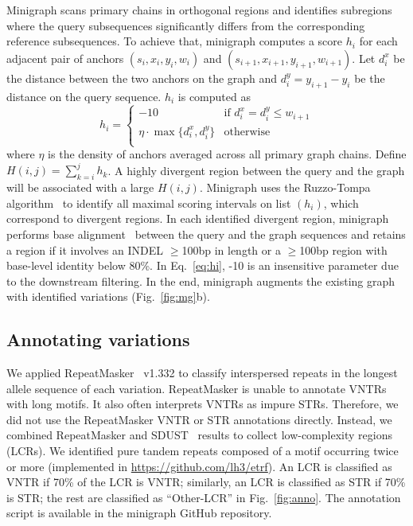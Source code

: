 \documentclass[twocolumn]{bmcart}
\begin{document}
Minigraph scans primary chains in orthogonal regions and identifies subregions
where the query subsequences significantly differs from the corresponding
reference subsequences. To achieve that, minigraph computes a score $h_i$ for
each adjacent pair of anchors $(s_i,x_i,y_i,w_i)$ and
$(s_{i+1},x_{i+1},y_{i+1},w_{i+1})$. Let $d^x_i$ be the distance between the
two anchors on the graph and $d^y_i=y_{i+1}-y_i$ be the distance on the query
sequence. $h_i$ is computed as
\begin{equation}\label{eq:hi}
h_i=\left\{\begin{array}{ll}
-10 & \mbox{if $d^x_i=d^y_i\le w_{i+1}$} \\
\eta\cdot\max\{d^x_i,d^y_i\} & \mbox{otherwise}\\
\end{array}\right.
\end{equation}
where $\eta$ is the density of anchors averaged across all primary graph
chains. Define $H(i,j)=\sum_{k=i}^j h_k$. A highly divergent region between the
query and the graph will be associated with a large $H(i,j)$. Minigraph uses
the Ruzzo-Tompa algorithm~\cite{DBLP:conf/ismb/RuzzoT99} to identify all
maximal scoring intervals on list $(h_i)$, which correspond to divergent
regions. In each identified divergent region, minigraph performs base
alignment~\cite{Suzuki:2018aa,Li:2018ab} between the query and the graph
sequences and retains a region if it involves an INDEL $\ge$100bp in length or
a $\ge$100bp region with base-level identity below 80\%. In Eq.~\ref{eq:hi},
-10 is an insensitive parameter due to the downstream filtering. In the end,
minigraph augments the existing graph with identified variations
(Fig.~\ref{fig:mg}b).

\subsection*{Annotating variations}

We applied RepeatMasker~\cite{Tarailo-Graovac:2009aa} v1.332 to classify
interspersed repeats in the longest allele sequence of each variation.
RepeatMasker is unable to annotate VNTRs with long motifs. It also often
interprets VNTRs as impure STRs. Therefore, we did not use the RepeatMasker
VNTR or STR annotations directly. Instead, we combined RepeatMasker and
SDUST~\cite{Morgulis:2006aa} results to collect low-complexity regions (LCRs).
We identified pure tandem repeats composed of a motif occurring twice or more
(implemented in
\href{https://github.com/lh3/etrf}{https://github.com/lh3/etrf}). An LCR is
classified as VNTR if 70\% of the LCR is VNTR; similarly, an LCR is classified
as STR if 70\% is STR; the rest are classified as ``Other-LCR'' in
Fig.~\ref{fig:anno}. The annotation script is available in the minigraph GitHub
repository.
\end{document}
